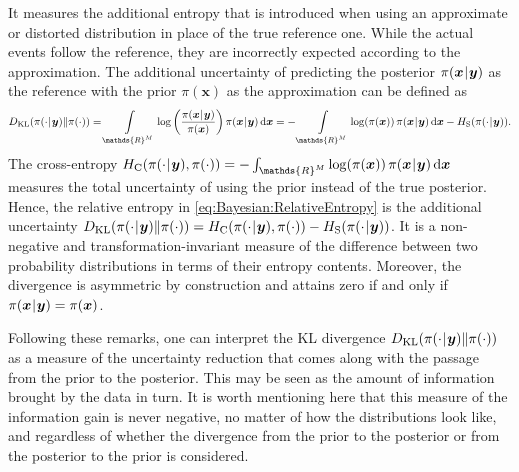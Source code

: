 It measures the additional entropy that is introduced when using an approximate or distorted distribution in place of the true reference one.
While the actual events follow the reference, they are incorrectly expected according to the approximation.
The additional uncertainty of predicting the posterior \(\pi(\bm{x} {\:\!}|{\:\!} \bm{y})\) as the reference with the prior \(\pi(\bm{x})\) as the approximation can be defined as
\begin{equation} \label{eq:Bayesian:RelativeEntropy}
  D_{\mathrm{KL}}(\pi(\cdot \cond \bm{y}) \| \pi(\cdot))
  = \int\limits_{\mathds{R}^{\dimParam}} \log \left( \frac{\pi(\bm{x} \cond \bm{y})}{\pi(\bm{x})} \right) \pi(\bm{x} \cond \bm{y}) \, \mathrm{d} \bm{x}
  = - \int\limits_{\mathds{R}^{\dimParam}} \log(\pi(\bm{x})) \, \pi(\bm{x} \cond \bm{y}) \, \mathrm{d} \bm{x} - H_{\mathrm{S}}(\pi(\cdot \cond \bm{y})).
\end{equation}
The cross-entropy \(H_{\mathrm{C}}(\pi(\cdot \cond \bm{y}),\pi(\cdot)) = - \int_{\mathds{R}^{\dimParam}} \log(\pi(\bm{x})) \, \pi(\bm{x} \cond \bm{y}) \, \mathrm{d} \bm{x}\)
measures the total uncertainty of using the prior instead of the true posterior.
Hence, the relative entropy in \cref{eq:Bayesian:RelativeEntropy} is the additional uncertainty
\(D_{\mathrm{KL}}(\pi(\cdot {\:\!}|{\:\!} \bm{y}) \| \pi(\cdot)) = H_{\mathrm{C}}(\pi(\cdot {\:\!}|{\:\!} \bm{y}),\pi(\cdot)) - H_{\mathrm{S}}(\pi(\cdot {\:\!}|{\:\!} \bm{y}))\).
It is a non-negative and transformation-invariant measure of the difference between two probability distributions in terms of their entropy contents.
Moreover, the divergence is asymmetric by construction and attains zero if and only if \(\pi(\bm{x} {\:\!}|{\:\!} \bm{y}) = \pi(\bm{x})\).
\par %
Following these remarks, one can interpret the KL divergence \(D_{\mathrm{KL}}(\pi(\cdot {\:\!}|{\:\!} \bm{y}) \| \pi(\cdot))\)
as a measure of the uncertainty reduction that comes along with the passage from the prior to the posterior.
This may be seen as the amount of information brought by the data in turn.
It is worth mentioning here that this measure of the information gain is never negative, no matter of how the distributions look like,
and regardless of whether the divergence from the prior to the posterior or from the posterior to the prior is considered.